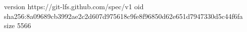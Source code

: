 version https://git-lfs.github.com/spec/v1
oid sha256:8a09689cb3992ae2c2d607d975618c9fe8f96850d62e651d7947330d5c44f6fa
size 5566
